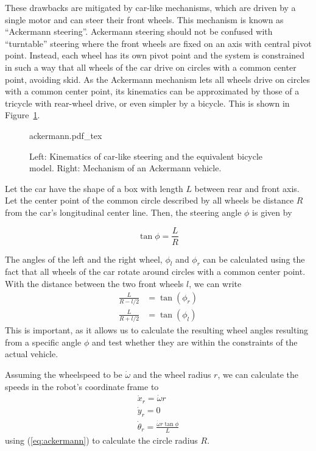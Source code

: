 These drawbacks are mitigated by car-like mechanisms, which are driven by a single motor and can steer their front wheels. This mechanism is known as ``Ackermann steering''.  Ackermann steering should not be confused with ``turntable'' steering  where the front wheels are fixed on an axis with central pivot point. Instead, each wheel has its own pivot point and the system is constrained in such a way that all wheels of the car drive on circles with a common center point, avoiding skid. As the Ackermann mechanism lets all wheels drive on circles with a common center point, its kinematics can be approximated by those of a tricycle with rear-wheel drive, or even simpler by a bicycle. This is shown in Figure~\ref{fig:ackermann}.

\begin{figure}[htb!]
    \centering
    \def\svgwidth{0.9\textwidth}
    {ackermann.pdf_tex}
    \caption{Left: Kinematics of car-like steering and the equivalent bicycle model. Right: Mechanism of an Ackermann vehicle.}
    \label{fig:ackermann}
\end{figure}

Let the car have the shape of a box with length $L$ between rear and front axis. Let the center point of the common circle described by all wheels be distance $ R$ from the car's longitudinal center line.  Then, the steering angle $ \phi$ is given by

\begin{equation}\label{eq:ackermann}
\tan \phi = \frac{L}{R}
\end{equation}

The angles of the left and the right wheel, $ \phi_l$ and $ \phi_r$ can be calculated using the fact that all wheels of the car rotate around circles with a common center point. With the distance between the two front wheels $l$, we can write
\begin{eqnarray}
\frac{L}{R-l/2}&=\tan{(\phi_r)}\\
\frac{L}{R+l/2}&=\tan{(\phi_l)}
\end{eqnarray}
This is important, as it allows us to calculate the resulting wheel angles resulting from a specific angle $\phi$ and test whether they are within the constraints of the actual vehicle.

Assuming the wheelspeed to be $\dot{\omega}$ and the wheel radius $r$, we can calculate the speeds in the robot's coordinate frame to
\begin{eqnarray}
\dot{x}_r=\dot{\omega}r\\
\dot{y}_r=0\\
\dot{\theta}_r=\frac{\dot{\omega}r\tan\phi}{L}
\end{eqnarray}
using (\ref{eq:ackermann}) to calculate the circle radius $R$.

